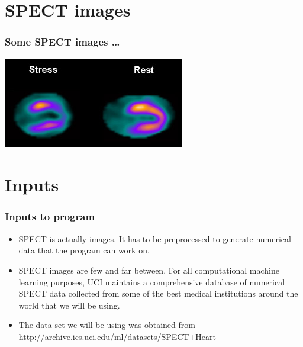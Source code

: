 \documentclass[11pt,xcolor=dvipsnames]{beamer}
\begin{document}
\section{SPECT images}	
\begin{frame}
\frametitle{Some SPECT images \ldots}	
\centering
\includegraphics[scale=1]{spect_images.png}
\end{frame}




\section{Inputs}	
\begin{frame}
\frametitle{Inputs to program}	
\begin{itemize}
\item SPECT is actually images. It has to be preprocessed to generate numerical data that the program can work on.\\
\item SPECT images are few and far between. For all computational machine learning purposes, UCI maintains a comprehensive database of numerical SPECT data collected from some of the best medical institutions around the world that we will be using.\\ 		
\item The data set we will be using was obtained from {\color{PineGreen} \\ \small http://archive.ics.uci.edu/ml/datasets/SPECT+Heart}
\end{itemize}
\end{frame}
\end{document}
